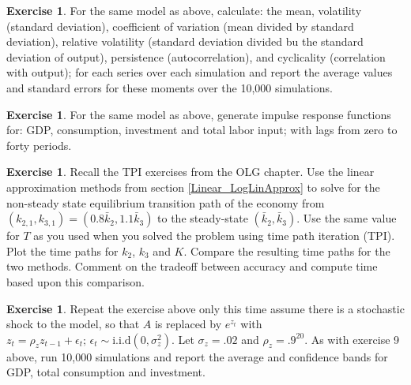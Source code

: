 \documentclass[letterpaper,12pt]{article}
\theoremstyle{definition}
\newtheorem{exercise}[theorem]{Exercise}
\begin{document}
\begin{spacing}{1.5}
	\begin{exercise} \label{Linear_HW_Base_Moments}
		For the same model as above, calculate: the mean, volatility (standard deviation), coefficient of variation (mean divided by standard deviation), relative volatility (standard deviation divided bu the standard deviation of output), persistence (autocorrelation), and cyclicality (correlation with output); for each series over each simulation and report the average values and standard errors for these moments over the 10,000 simulations.
	\end{exercise}

	\begin{exercise} \label{Linear_HW_Base_IRFs}
		For the same model as above, generate impulse response functions for: GDP, consumption, investment and total labor input; with lags from zero to forty periods.
	\end{exercise}

	\begin{exercise} \label{Linear_HW_OLG}
		Recall the TPI exercises from the OLG chapter.  Use the linear approximation methods from section \ref{Linear_LogLinApprox} to solve for the non-steady state equilibrium transition path of the economy from $(k_{2,1},k_{3,1})=(0.8\bar{k}_2,1.1\bar{k}_3)$ to the steady-state $(\bar{k}_2,\bar{k}_3)$. Use the same value for $T$ as you used when you solved the problem using time path iteration (TPI).  Plot the time paths for $k_2$, $k_3$ and $K$.  Compare the resulting time paths for the two methods.  Comment on the tradeoff between accuracy and compute time based upon this comparison.
	\end{exercise}

	\begin{exercise} \label{Linear_HW_OLG_Stoch}
		Repeat the exercise above only this time assume there is a stochastic shock to the model, so that $A$ is replaced by $e^{z_t}$ with $z_t = \rho_z z_{t-1} + \epsilon_t;\,\epsilon_t \sim \text{i.i.d} (0,\sigma_z^2)$.  Let $\sigma_z=.02$ and $\rho_z=.9^{20}$.  As with exercise 9 above, run 10,000 simulations and report the average and confidence bands for GDP, total consumption and investment.
	\end{exercise}

\end{spacing}

\newpage


\end{document}

